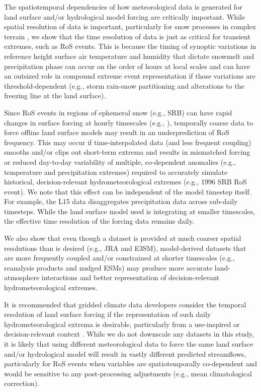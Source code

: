 \documentclass[nhess, manuscript]{copernicus}
\begin{document}
The spatiotemporal dependencies of how meteorological data is generated for land surface and/or hydrological model forcing are critically important.
While spatial resolution of data is important, particularly for snow processes in complex terrain \citep{henn2018an,Woodburn2021}, we show that the time resolution of data is just as critical for transient extremes, such as RoS events.
This is because the timing of synoptic variations in reference height surface air temperature and humidity that dictate snowmelt and precipitation phase can occur on the order of hours at local scales and can have an outsized role in compound extreme event representation if those variations are threshold-dependent (e.g., storm rain-snow partitioning and alterations to the freezing line at the land surface).

Since RoS events in regions of ephemeral snow (e.g., SRB) can have rapid changes in surface forcing at hourly timescales (e.g., \citet{leathers1998severe}), temporally coarse data to force offline land surface models may result in an underprediction of RoS frequency.
This may occur if time-interpolated data (and less frequent coupling) smooths and/or clips out short-term extrema and results in mismatched forcing or reduced day-to-day variability of multiple, co-dependent anomalies (e.g., temperature and precipitation extremes) required to accurately simulate historical, decision-relevant hydrometeorological extremes (e.g., 1996 SRB RoS event). We note that this effect can be independent of the model timestep itself. For example, the L15 data disaggregates precipitation data across sub-daily timesteps. While the land surface model used is integrating at smaller timescales, the effective time resolution of the forcing data remains daily.

We also show that even though a dataset is provided at much coarser spatial resolutions than is desired (e.g., JRA and E3SM), model-derived datasets that are more frequently coupled and/or constrained at shorter timescales (e.g., reanalysis products and nudged ESMs) may produce more accurate land-atmosphere interactions and better representation of decision-relevant hydrometeorological extremes.

It is recommended that gridded climate data developers consider the temporal resolution of land surface forcing if the representation of such daily hydrometeorological extrema is desirable, particularly from a use-inspired or decision-relevant context \citep{Jagannathan2021}.
While we do not downscale any datasets in this study, it is likely that using different meteorological data to force the same land surface and/or hydrological model will result in vastly different predicted streamflows, particularly for RoS events when variables are spatiotemporally co-dependent and would be sensitive to any post-processing adjustments (e.g., mean climatological correction).
\end{document}
